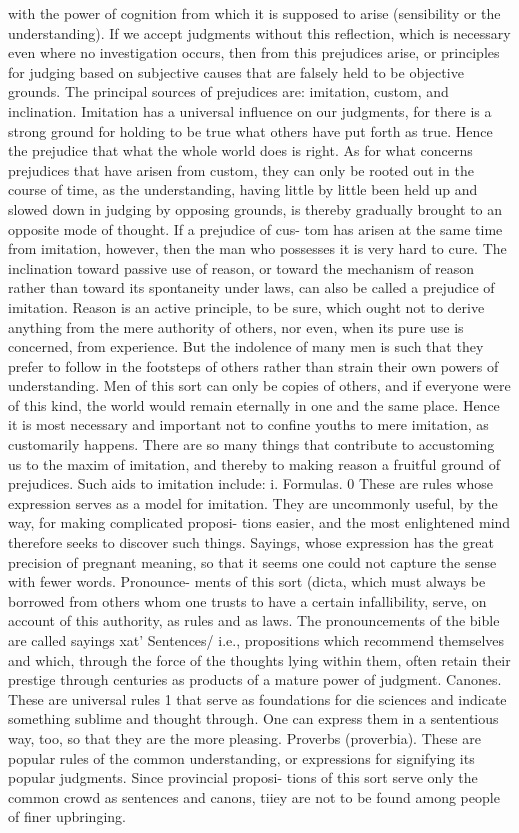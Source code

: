 with the power of cognition from which it is supposed to arise (sensibility
or the understanding). If we accept judgments without this reflection,
which is necessary even where no investigation occurs, then from this
prejudices arise, or principles for judging based on subjective causes that
are falsely held to be objective grounds.
The principal sources of prejudices are: imitation, custom, and inclination.
Imitation has a universal influence on our judgments, for there is a
strong ground for holding to be true what others have put forth as true.
Hence the prejudice that what the whole world does is right. As for what
concerns prejudices that have arisen from custom, they can only be rooted
out in the course of time, as the understanding, having little by little been
held up and slowed down in judging by opposing grounds, is thereby
gradually brought to an opposite mode of thought. If a prejudice of cus-
tom has arisen at the same time from imitation, however, then the man
who possesses it is very hard to cure. The inclination toward passive use of
reason, or toward the mechanism of reason rather than toward its spontaneity
under laws, can also be called a prejudice of imitation.
Reason is an active principle, to be sure, which ought not to derive
anything from the mere authority of others, nor even, when its pure use is
concerned, from experience. But the indolence of many men is such that
they prefer to follow in the footsteps of others rather than strain their own
powers of understanding. Men of this sort can only be copies of others,
and if everyone were of this kind, the world would remain eternally in one
and the same place. Hence it is most necessary and important not to
confine youths to mere imitation, as customarily happens.
There are so many things that contribute to accustoming us to the
maxim of imitation, and thereby to making reason a fruitful ground of
prejudices. Such aids to imitation include:
i. Formulas. 0 These are rules whose expression serves as a model for imitation.
They are uncommonly useful, by the way, for making complicated proposi-
tions easier, and the most enlightened mind therefore seeks to discover such
things.
Sayings, whose expression has the great precision of pregnant meaning, so
that it seems one could not capture the sense with fewer words. Pronounce-
ments of this sort (dicta\), which must always be borrowed from others whom
one trusts to have a certain infallibility, serve, on account of this authority, as
rules and as laws. The pronouncements of the bible are called sayings xat'
Sentences/ i.e., propositions which recommend themselves and which,
through the force of the thoughts lying within them, often retain their prestige
through centuries as products of a mature power of judgment.
Canones. These are universal rules 1 that serve as foundations for die sciences
and indicate something sublime and thought through. One can express them
in a sententious way, too, so that they are the more pleasing.
Proverbs (proverbia). These are popular rules of the common understanding,
or expressions for signifying its popular judgments. Since provincial proposi-
tions of this sort serve only the common crowd as sentences and canons, tiiey
are not to be found among people of finer upbringing.

